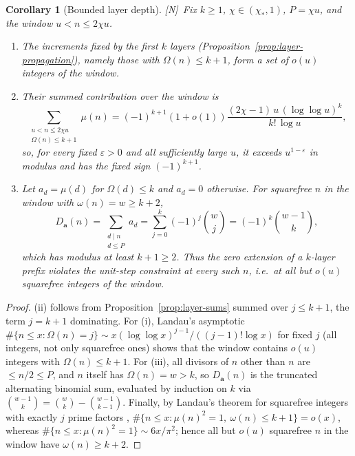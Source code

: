 \documentclass[11pt]{amsart}
\numberwithin{equation}{section}
\theoremstyle{plain}
\newtheorem{corollary}[theorem]{Corollary}
\theoremstyle{definition}
\theoremstyle{remark}
\newcommand{\eps}{\varepsilon}
\newcommand{\tagN}{\textup{[N]}}
\begin{document}
\begin{corollary}[Bounded layer depth]
\label{cor:bounded-depth}
\tagN\ Fix $k\ge1$, $\chi\in(\chi_*,1)$, $P=\chi u$, and the window
$u<n\le2\chi u$.
\begin{enumerate}[label=\textup{(\roman*)}]
\item The increments fixed by the first $k$ layers
(Proposition~\ref{prop:layer-propagation}), namely those with
$\Omega(n)\le k+1$, form a set of $o(u)$ integers of the window.
\item Their summed contribution over the window is
\[
\sum_{\substack{u<n\le2\chi u\\ \Omega(n)\le k+1}}\mu(n)
=(-1)^{k+1}(1+o(1))\frac{(2\chi-1)\,u\,(\log\log u)^{k}}{k!\,\log u},
\]
so, for every fixed $\eps>0$ and all sufficiently large $u$, it exceeds $u^{1-\eps}$ in modulus and has the fixed sign $(-1)^{k+1}$.
\item Let $a_d=\mu(d)$ for $\Omega(d)\le k$ and $a_d=0$ otherwise.
For squarefree $n$ in the window with $\omega(n)=w\ge k+2$,
\[
D_{\mathbf a}(n)=\sum_{\substack{d\mid n\\ d\le P}}a_d
=\sum_{j=0}^{k}(-1)^j\binom wj=(-1)^k\binom{w-1}{k},
\]
which has modulus at least $k+1\ge2$. Thus the zero extension of a
$k$-layer prefix violates the unit-step constraint at every such $n$, i.e.\
at all but $o(u)$ squarefree integers of the window.
\end{enumerate}
\end{corollary}

\begin{proof}
(ii) follows from Proposition~\ref{prop:layer-sums} summed over
$j\le k+1$, the term $j=k+1$ dominating. For (i), Landau's asymptotic
$\#\{n\le x:\Omega(n)=j\}\sim x(\log\log x)^{j-1}/((j-1)!\log x)$ for
fixed $j$ \cite[Ch.~7]{MontgomeryVaughan2007} (all integers, not only
squarefree ones) shows that the window contains $o(u)$ integers with
$\Omega(n)\le k+1$. For (iii), all divisors of $n$
other than $n$ are $\le n/2\le P$, and $n$ itself has $\Omega(n)=w>k$, so
$D_{\mathbf a}(n)$ is the truncated alternating binomial sum, evaluated by
induction on $k$ via $\binom{w-1}{k}=\binom wk-\binom{w-1}{k-1}$. Finally, by
Landau's theorem for squarefree integers with exactly $j$ prime factors
\cite[Ch.~7]{MontgomeryVaughan2007},
$\#\{n\le x:\mu(n)^2=1,\ \omega(n)\le k+1\}=o(x)$, whereas
$\#\{n\le x:\mu(n)^2=1\}\sim6x/\pi^2$; hence all but $o(u)$ squarefree $n$ in
the window have $\omega(n)\ge k+2$.
\end{proof}
\end{document}
